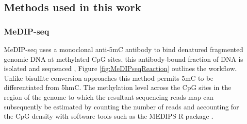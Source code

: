 \documentclass[
]{book}
\begin{document}
\hypertarget{methods-used-in-this-work}{%
\subsection{Methods used in this work}\label{methods-used-in-this-work}}

\hypertarget{MeDIPseq}{%
\subsubsection{MeDIP-seq}\label{MeDIPseq}}

MeDIP-seq uses a monoclonal anti-5mC antibody to bind denatured fragmented genomic DNA at methylated CpG sites, this antibody-bound fraction of DNA is isolated and sequenced \citep{Down2009}, Figure \ref{fig:MeDIPseqReaction} outlines the workflow. Unlike bisulfite conversion approaches this method permits 5mC to be differentiated from 5hmC. The methylation level across the CpG sites in the region of the genome to which the resultant sequencing reads map can subsequently be estimated by counting the number of reads and accounting for the CpG density with software tools such as the MEDIPS R package \citep{Lienhard2014}.
\end{document}
